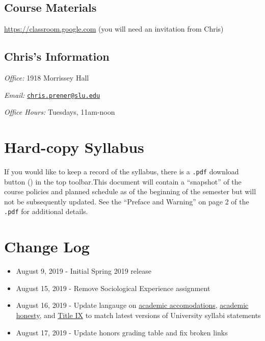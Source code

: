 \documentclass[]{book}
\providecommand{\tightlist}{%
  \setlength{\itemsep}{0pt}\setlength{\parskip}{0pt}}
\begin{document}
\hypertarget{course-materials}{%
\subsection*{Course Materials}\label{course-materials}}

\url{https://classroom.google.com} (you will need an invitation from Chris)

\hypertarget{chriss-information}{%
\subsection*{Chris's Information}\label{chriss-information}}

\emph{Office:} 1918 Morrissey Hall

\emph{Email:} \href{mailto:chris.prener@slu.edu}{\nolinkurl{chris.prener@slu.edu}}

\emph{Office Hours:} Tuesdays, 11am-noon

\hypertarget{hard-copy-syllabus}{%
\section*{Hard-copy Syllabus}\label{hard-copy-syllabus}}

If you would like to keep a record of the syllabus, there is a \texttt{.pdf} download button () in the top toolbar.This document will contain a ``snapshot'' of the course policies and planned schedule as of the beginning of the semester but will not be subsequently updated. See the ``Preface and Warning'' on page 2 of the \texttt{.pdf} for additional details.

\hypertarget{change-log}{%
\section*{Change Log}\label{change-log}}

\begin{itemize}
\tightlist
\item
  August 9, 2019 - Initial Spring 2019 release
\item
  August 15, 2019 - Remove Sociological Experience assignment
\item
  August 16, 2019 - Update langauge on \href{/syllabus/student-support.html}{academic accomodations}, \href{/syllabus/academic-honesty.html}{academic honesty}, and \href{/syllabus/harassment-and-title-ix.html}{Title IX} to match latest versions of University syllabi statements
\item
  August 17, 2019 - Update honors grading table and fix broken links
\end{itemize}
\end{document}
